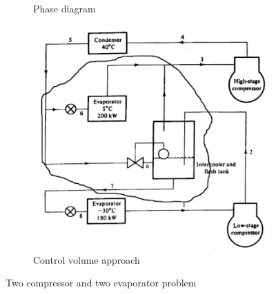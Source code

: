 \documentclass{article}
\begin{document}
\begin{figure}[H]
\begin{subfigure}{0.3\textwidth}
      \caption{Phase diagram}
      \label{subfig:Phase_diagram}
  \end{subfigure}\hfill
  \begin{subfigure}{0.3\textwidth}
      \includegraphics[width=\textwidth]{img/two_com_2_evap_phase_dia_control_volume.jpeg}
      \caption{Control volume approach}
      \label{subfig:Control_volume_approach}
  \end{subfigure}

  \caption{Two compressor and two evaporator problem}
  \label{fig:2-c-2-e} 
\end{figure}
\end{document}

